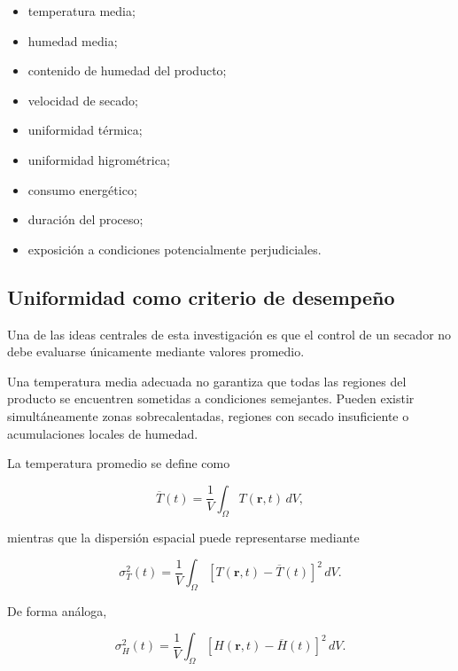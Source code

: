\begin{itemize}
    \item temperatura media;
    \item humedad media;
    \item contenido de humedad del producto;
    \item velocidad de secado;
    \item uniformidad térmica;
    \item uniformidad higrométrica;
    \item consumo energético;
    \item duración del proceso;
    \item exposición a condiciones potencialmente perjudiciales.
\end{itemize}

\subsection{Uniformidad como criterio de desempeño}
\label{subsec:uniformidad_desempeno}

Una de las ideas centrales de esta investigación es que el control de un secador no debe evaluarse únicamente mediante valores promedio.

Una temperatura media adecuada no garantiza que todas las regiones del producto se encuentren sometidas a condiciones semejantes. Pueden existir simultáneamente zonas sobrecalentadas, regiones con secado insuficiente o acumulaciones locales de humedad.

La temperatura promedio se define como

\begin{equation}
\overline{T}(t)
=
\frac{1}{V}
\int_{\Omega}
T(\mathbf{r},t)\,dV,
\end{equation}

mientras que la dispersión espacial puede representarse mediante

\begin{equation}
\sigma_T^2(t)
=
\frac{1}{V}
\int_{\Omega}
\left[
T(\mathbf{r},t)-\overline{T}(t)
\right]^2
\,dV.
\end{equation}

De forma análoga,

\begin{equation}
\sigma_H^2(t)
=
\frac{1}{V}
\int_{\Omega}
\left[
H(\mathbf{r},t)-\overline{H}(t)
\right]^2
\,dV.
\end{equation}


